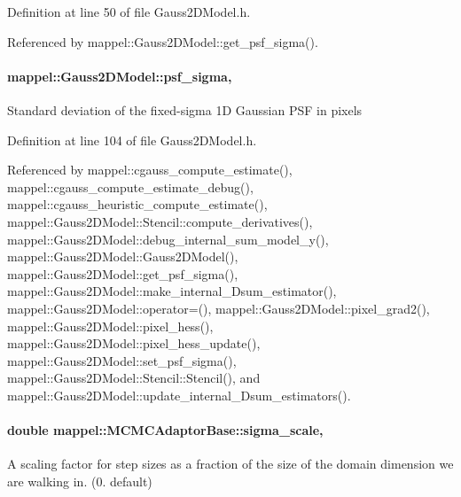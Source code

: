 Definition at line 50 of file Gauss2\+D\+Model.\+h.



Referenced by mappel\+::\+Gauss2\+D\+Model\+::get\+\_\+psf\+\_\+sigma().

\paragraph[{\texorpdfstring{psf\+\_\+sigma}{psf_sigma}}]{ mappel\+::\+Gauss2\+D\+Model\+::psf\+\_\+sigma\hspace{0.3cm}{\ttfamily [protected]}, {\ttfamily [inherited]}}\hypertarget{classmappel_1_1Gauss2DModel_acb73f86ea080515e843f47be9502b271}{}\label{classmappel_1_1Gauss2DModel_acb73f86ea080515e843f47be9502b271}
Standard deviation of the fixed-\/sigma 1D Gaussian P\+SF in pixels 

Definition at line 104 of file Gauss2\+D\+Model.\+h.



Referenced by mappel\+::cgauss\+\_\+compute\+\_\+estimate(), mappel\+::cgauss\+\_\+compute\+\_\+estimate\+\_\+debug(), mappel\+::cgauss\+\_\+heuristic\+\_\+compute\+\_\+estimate(), mappel\+::\+Gauss2\+D\+Model\+::\+Stencil\+::compute\+\_\+derivatives(), mappel\+::\+Gauss2\+D\+Model\+::debug\+\_\+internal\+\_\+sum\+\_\+model\+\_\+y(), mappel\+::\+Gauss2\+D\+Model\+::\+Gauss2\+D\+Model(), mappel\+::\+Gauss2\+D\+Model\+::get\+\_\+psf\+\_\+sigma(), mappel\+::\+Gauss2\+D\+Model\+::make\+\_\+internal\+\_\+Dsum\+\_\+estimator(), mappel\+::\+Gauss2\+D\+Model\+::operator=(), mappel\+::\+Gauss2\+D\+Model\+::pixel\+\_\+grad2(), mappel\+::\+Gauss2\+D\+Model\+::pixel\+\_\+hess(), mappel\+::\+Gauss2\+D\+Model\+::pixel\+\_\+hess\+\_\+update(), mappel\+::\+Gauss2\+D\+Model\+::set\+\_\+psf\+\_\+sigma(), mappel\+::\+Gauss2\+D\+Model\+::\+Stencil\+::\+Stencil(), and mappel\+::\+Gauss2\+D\+Model\+::update\+\_\+internal\+\_\+Dsum\+\_\+estimators().

\paragraph[{\texorpdfstring{sigma\+\_\+scale}{sigma_scale}}]{\setlength{\rightskip}{0pt plus 5cm}double mappel\+::\+M\+C\+M\+C\+Adaptor\+Base\+::sigma\+\_\+scale\hspace{0.3cm}{\ttfamily [protected]}, {\ttfamily [inherited]}}\hypertarget{classmappel_1_1MCMCAdaptorBase_a76312f7d589bf3f3e754beca174b884b}{}\label{classmappel_1_1MCMCAdaptorBase_a76312f7d589bf3f3e754beca174b884b}
A scaling factor for step sizes as a fraction of the size of the domain dimension we are walking in. (0. default) 

